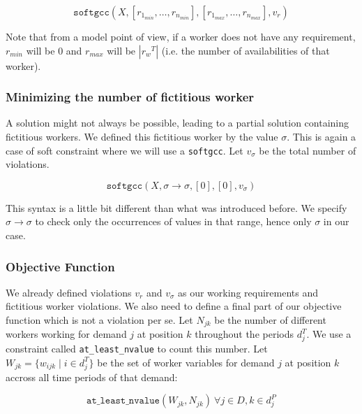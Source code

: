 \documentclass[../../thesis.tex]{subfiles}
\begin{document}
\begin{equation}
  \texttt{softgcc}(X, [r_{1_{min}}, \dots, r_{n_{min}}], [r_{1_{max}}, \dots, r_{n_{max}}], v_{r}) 
\end{equation}

Note that from a model point of view, if a worker does not have any requirement, $r_{min}$ will be 0 and $r_{max}$ will be $|{r_w}^T| $ (i.e. the number of availabilities of that worker).

\subsubsection{Minimizing the number of fictitious worker}

A solution might not always be possible, leading to a partial solution containing fictitious workers.
We defined this fictitious worker by the value $\sigma$. This is again a case of soft constraint where 
we will use a \texttt{softgcc}. Let $v_{\sigma}$ be the total number of violations.


\begin{equation}
  \texttt{softgcc}(X, \sigma \rightarrow \sigma, [0], [0], v_{\sigma})
\end{equation}

This syntax is a little bit different than what was introduced before. We specify $\sigma \rightarrow \sigma$ to check only the occurrences of values 
in that range, hence only $\sigma$ in our case.


\subsubsection{Objective Function}

We already defined violations $v_r$ and $v_{\sigma}$ as our working requirements and fictitious worker violations.
We also need to define a final part of our objective function which is not a violation per se. Let $N_{jk}$ be the number 
of different workers working for demand $j$ at position $k$ throughout the periods $d_j^T$. We use a 
constraint called \texttt{at\_least\_nvalue} to count this number.
Let  $W_{jk} = \{ w_{ijk} \mid i \in d^T_j \}$ be the set of worker variables for demand $j$ at position $k$ accross all time periods of that demand:

\begin{equation}
  \texttt{at\_least\_nvalue}(W_{jk}, N_{jk}) \ \forall j \in D, k \in d^P_j
\end{equation}
\end{document}
